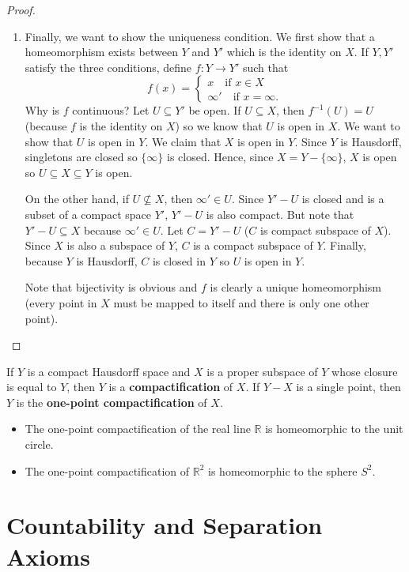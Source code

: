 \documentclass{article}
\newcommand{\nline}{\vspace*{0.5\baselineskip}}
\theoremstyle{definition}
\begin{document}
\begin{flushleft}
\begin{proof}
\begin{enumerate}
    \item Finally, we want to show the uniqueness condition. We first show that a homeomorphism exists between $Y$ and $Y'$ which is the identity on $X$. If $Y, Y'$ satisfy the three conditions, define $f: Y \to Y'$ such that
    \[
    f(x) = \begin{cases}
    x \quad \text{if $x \in X$} \\
    \infty' \quad \text{if $x = \infty$}.
    \end{cases}
    \]
    Why is $f$ continuous? Let $U \subseteq Y'$ be open. If $U \subseteq X$, then $f^{-1}(U) = U$ (because $f$ is the identity on $X$) so we know that $U$ is open in $X$. We want to show that $U$ is open in $Y$. We claim that $X$ is open in $Y$. Since $Y$ is Hausdorff, singletons are closed so $\{\infty\}$ is closed. Hence, since $X = Y - \{\infty\}$, $X$ is open so $U \subseteq X \subseteq Y$ is open.

    \nline

    On the other hand, if $U \not\subseteq X$, then $\infty' \in U$. Since $Y' - U$ is closed and is a subset of a compact space $Y'$, $Y' - U$ is also compact. But note that $Y' - U \subseteq X$ because $\infty' \in U$. Let $C = Y' - U$ ($C$ is compact subspace of $X$). Since $X$ is also a subspace of $Y$, $C$ is a compact subspace of $Y$. Finally, because $Y$ is Hausdorff, $C$ is closed in $Y$ so $U$ is open in $Y$.

    \nline

    Note that bijectivity is obvious and $f$ is clearly a unique homeomorphism (every point in $X$ must be mapped to itself and there is only one other point).
\end{enumerate}
\end{proof}

If $Y$ is a compact Hausdorff space and $X$ is a proper subspace of $Y$ whose closure is equal to $Y$, then $Y$ is a \textbf{compactification} of $X$. If $Y - X$ is a single point, then $Y$ is the \textbf{one-point compactification} of $X$.

\begin{itemize}
    \item The one-point compactification of the real line $\mathbb{R}$ is homeomorphic to the unit circle.
    \item The one-point compactification of $\mathbb{R}^2$ is homeomorphic to the sphere $S^2$.
\end{itemize}

\section{Countability and Separation Axioms}


\end{flushleft}
\end{document}
